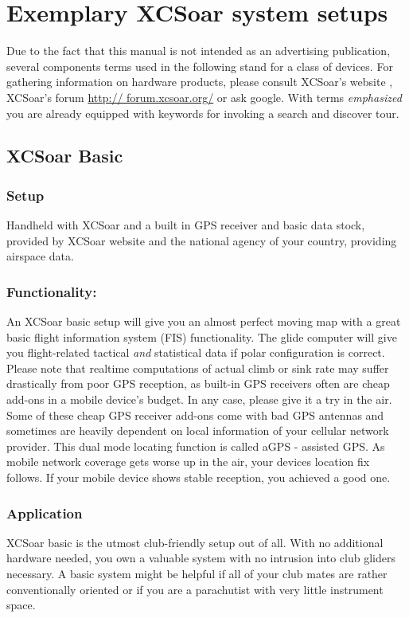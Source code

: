 \section{Exemplary XCSoar system setups}
Due to the fact that this manual is not intended as an advertising publication,
several components terms used in the following stand for a class of devices. For
gathering information on hardware products, please consult XCSoar's website 
, XCSoar's forum \url{http://
forum.xcsoar.org/} or ask google. With terms \emph{emphasized} you are already 
equipped with keywords for invoking a search and discover tour.

\subsection*{XCSoar Basic}
\subsubsection*{Setup} Handheld with XCSoar and a built in GPS receiver and basic 
data stock, provided by XCSoar website and the national agency of your country, 
providing airspace data.

\subsubsection*{Functionality:} An XCSoar basic setup will give you an almost 
perfect moving map with a great basic flight information system (FIS) 
functionality. The glide computer will give you flight-related tactical 
\emph{and} statistical data if polar configuration is correct. Please note that
realtime computations of actual climb or sink rate may suffer drastically from
poor GPS reception, as built-in GPS receivers often are cheap add-ons in a mobile
device's budget. In any case, please give it a try in the air.  Some of these 
cheap GPS receiver add-ons come with bad GPS antennas and sometimes are heavily 
dependent on local information of your cellular network provider. This dual mode 
locating function is called aGPS - assisted GPS. As mobile network coverage gets 
worse up in the air, your devices location fix follows. If your mobile device 
shows stable reception, you achieved a good one.

\subsubsection*{Application} XCSoar basic is the utmost club-friendly setup out 
of all.  With no additional hardware needed, you own a valuable system with no 
intrusion into club gliders necessary. A basic system might be helpful if all of 
your club mates are rather conventionally oriented or if you are a parachutist 
with very little instrument space.

